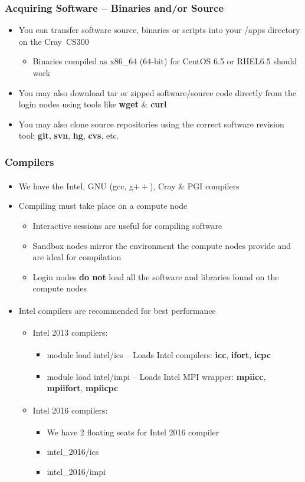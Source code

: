 \documentclass[t,hyperref={pdfpagelabels=false}]{beamer}
\newcommand{\ctilde}{{\fontfamily{ptm}\selectfont\texttildelow}}
\newcommand{\regtrademark}{\fontsize{5}{6}\selectfont \textsuperscript{\textregistered}}
\newcommand{\intel}{Intel{\regtrademark}}
\newcommand{\cray}{Cray{\regtrademark}}
\newcommand{\craycs}{Cray~CS300}
\begin{document}
\begin{frame}
	\frametitle{Acquiring Software -- Binaries and/or Source}
	\begin{itemize}
		\item	You can transfer software source, binaries or scripts into your \ctilde{}/apps directory on the {\craycs}
		\begin{itemize}
			\item Binaries compiled as x86\_64 (64-bit) for CentOS 6.5 or RHEL6.5 should work
		\end{itemize}
		\item You may also download tar or zipped software/source code directly from the login nodes using tools like \textbf{wget} \& \textbf{curl}
		\item You may also clone source repositories using the correct software revision tool: \textbf{git}, \textbf{svn}, \textbf{hg}, \textbf{cvs}, etc.
	\end{itemize}
\end{frame}


\begin{frame}
\frametitle{Compilers}
	\begin{itemize}
		\item We have the {\intel}, GNU (gcc, g$++$), {\cray} \& PGI{\regtrademark} compilers
		\item Compiling must take place on a compute node
		\begin{itemize}
			\item Interactive sessions are useful for compiling software
			\item Sandbox nodes mirror the environment the compute nodes provide and are ideal for compilation
			\item Login nodes \textbf{do not} load all the software and libraries found on the compute nodes
		\end{itemize}
		\item {\intel} compilers are recommended for best performance
		\begin{itemize}
			\item {\intel} 2013 compilers:
			\begin{itemize}
				\item module load intel/ics -- Loads {\intel} compilers: {\tiny \textbf{icc}, \textbf{ifort}, \textbf{icpc}}
				\item module load intel/impi -- Loads {\intel} MPI wrapper: {\tiny\textbf{mpiicc}, \textbf{mpiifort}, \textbf{mpiicpc}}
			\end{itemize}
			\item {\intel} 2016 compilers:
			\begin{itemize}
				\item We have 2 floating seats for {\intel} 2016 compiler
				\item intel\_2016/ics 
				\item intel\_2016/impi 
			\end{itemize}
		\end{itemize}			
	\end{itemize}
\end{frame}
\end{document}

